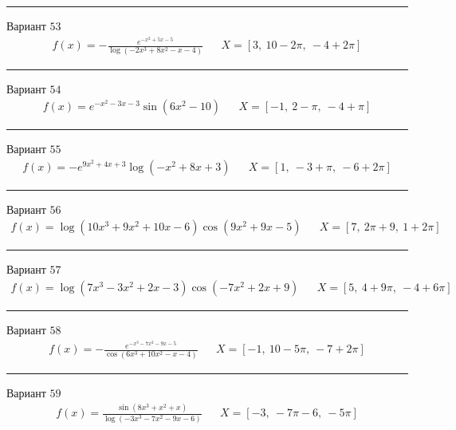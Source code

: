 \documentclass[11pt]{report}
\begin{document}
\begin{center}
    \noindent\rule{8cm}{0.4pt}
\end{center}
Вариант \(53\)
\begin{align*}
    f(x) = - \frac{e^{- x^{2} + 5 x - 5}}{\log{\left(- 2 x^{3} + 8 x^{2} - x - 4 \right)}} && X = \left[ 3, \  10 - 2 \pi, \  -4 + 2 \pi\right]
\end{align*}
\begin{center}
    \noindent\rule{8cm}{0.4pt}
\end{center}
Вариант \(54\)
\begin{align*}
    f(x) = e^{- x^{2} - 3 x - 3} \sin{\left(6 x^{2} - 10 \right)} && X = \left[ -1, \  2 - \pi, \  -4 + \pi\right]
\end{align*}
\begin{center}
    \noindent\rule{8cm}{0.4pt}
\end{center}
Вариант \(55\)
\begin{align*}
    f(x) = - e^{9 x^{2} + 4 x + 3} \log{\left(- x^{2} + 8 x + 3 \right)} && X = \left[ 1, \  -3 + \pi, \  -6 + 2 \pi\right]
\end{align*}
\begin{center}
    \noindent\rule{8cm}{0.4pt}
\end{center}
Вариант \(56\)
\begin{align*}
    f(x) = \log{\left(10 x^{3} + 9 x^{2} + 10 x - 6 \right)} \cos{\left(9 x^{2} + 9 x - 5 \right)} && X = \left[ 7, \  2 \pi + 9, \  1 + 2 \pi\right]
\end{align*}
\begin{center}
    \noindent\rule{8cm}{0.4pt}
\end{center}
Вариант \(57\)
\begin{align*}
    f(x) = \log{\left(7 x^{3} - 3 x^{2} + 2 x - 3 \right)} \cos{\left(- 7 x^{2} + 2 x + 9 \right)} && X = \left[ 5, \  4 + 9 \pi, \  -4 + 6 \pi\right]
\end{align*}
\begin{center}
    \noindent\rule{8cm}{0.4pt}
\end{center}
Вариант \(58\)
\begin{align*}
    f(x) = - \frac{e^{- x^{3} - 7 x^{2} - 9 x - 5}}{\cos{\left(6 x^{3} + 10 x^{2} - x - 4 \right)}} && X = \left[ -1, \  10 - 5 \pi, \  -7 + 2 \pi\right]
\end{align*}
\begin{center}
    \noindent\rule{8cm}{0.4pt}
\end{center}
Вариант \(59\)
\begin{align*}
    f(x) = \frac{\sin{\left(8 x^{3} + x^{2} + x \right)}}{\log{\left(- 3 x^{3} - 7 x^{2} - 9 x - 6 \right)}} && X = \left[ -3, \  - 7 \pi - 6, \  - 5 \pi\right]
\end{align*}
\end{document}

